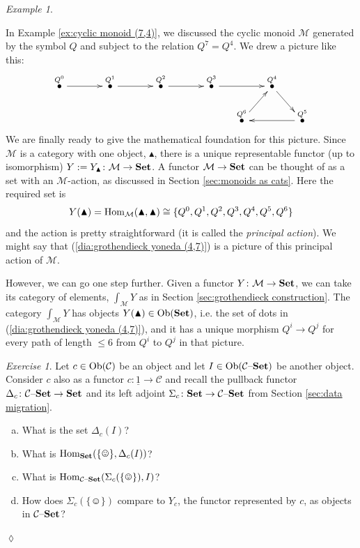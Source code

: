 \documentclass{book}
\def\tn{\textnormal}
\def\mc{\mathcal}
\def\Hom{\tn{Hom}}
\def\Ob{\tn{Ob}}
\def\singleton{\{\smiley\}}
\def\to{\rightarrow}
\def\taking{\colon}
\def\iso{\cong}
\def\ul{\underline}
\newcommand{\LMO}[1]{\stackrel{#1}{\bullet}}
\def\monOb{\blacktriangle}
\def\Set{{\bf Set}}
\def\set{{\text \textendash}{\bf Set}}
\def\mcC{\mc{C}}
\def\mcM{\mc{M}}
\theoremstyle{remark}
\newtheorem{example}[subsubsection]{Example}
\newtheorem{exc}[subsubsection]{Exercise}
\newenvironment{exercise}{\begin{exc}}{\hspace*{\fill}$\lozenge$\end{exc}}
\theoremstyle{definition}
\def\sexc{\begin{enumerate}[a.)]\setlength{\itemsep}{.1cm}\setlength{\parskip}{.1cm}\item}
\def\next{\item}
\def\endsexc{\end{enumerate}}
\begin{document}
\begin{example}\label{ex:yoneda for cyclic monoid}

In Example \ref{ex:cyclic monoid (7,4)}, we discussed the cyclic monoid $\mcM$ generated by the symbol $Q$ and subject to the relation $Q^7=Q^4$. We drew a picture like this: 
\begin{align}\label{dia:grothendieck yoneda (4,7)}
\xymatrix@=15pt{
\LMO{Q^0}\ar[rr]&&\LMO{Q^1}\ar[rr]&&\LMO{Q^2}\ar[rr]&&\LMO{Q^3}\ar[rr]&&\LMO{Q^4}\ar[dr]\\
&&&&&&&\LMO{Q^6}\ar[ur]&&\LMO{Q^5}\ar[ll]
}
\end{align}
We are finally ready to give the mathematical foundation for this picture. Since $\mcM$ is a category with one object, $\monOb$, there is a unique representable functor (up to isomorphism) $Y:=Y_\monOb\taking\mcM\to\Set$. A functor $\mcM\to\Set$ can be thought of as a set with an $\mcM$-action, as discussed in Section \ref{sec:monoids as cats}. Here the required set is 
$$Y(\monOb)=\Hom_\mcM(\monOb,\monOb)\iso\{Q^0,Q^1,Q^2,Q^3,Q^4,Q^5,Q^6\}$$ 
and the action is pretty straightforward (it is called the {\em principal action}). We might say that (\ref{dia:grothendieck yoneda (4,7)}) is a picture of this principal action of $\mcM$. 

However, we can go one step further. Given a functor $Y\taking\mcM\to\Set$, we can take its category of elements, $\int_\mcM Y$ as in Section \ref{sec:grothendieck construction}. The category $\int_\mcM Y$ has objects $Y(\monOb)\in\Ob(\Set)$, i.e. the set of dots in (\ref{dia:grothendieck yoneda (4,7)}), and it has a unique morphism $Q^i\to Q^j$ for every path of length $\leq 6$ from $Q^i$ to $Q^j$ in that picture.

\end{example}

\begin{exercise}

Let $c\in\Ob(\mcC)$ be an object and let $I\in\Ob(\mcC\set)$ be another object. Consider $c$ also as a functor $c\taking\ul{1}\to\mcC$ and recall the pullback functor $\Delta_c\taking\mcC\set\to\Set$ and its left adjoint $\Sigma_c\taking\Set\to\mcC\set$ from Section \ref{sec:data migration}.
\sexc What is the set $\Delta_c(I)$?
\next What is $\Hom_\Set(\singleton,\Delta_c(I))$?
\next What is $\Hom_{\mcC\set}(\Sigma_c(\singleton),I)$?
\next How does $\Sigma_c(\singleton)$ compare to $Y_c$, the functor represented by $c$, as objects in $\mcC\set$?
\endsexc
\end{exercise}
\end{document}
